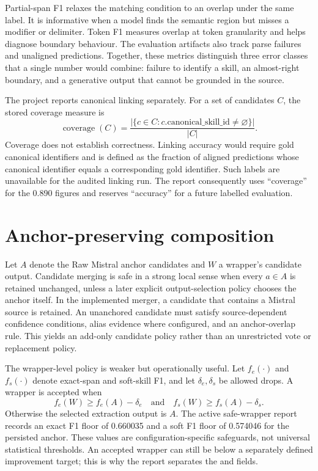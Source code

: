 Partial-span F1 relaxes the matching condition to an overlap under the same label. It is informative when a model finds the semantic region but misses a modifier or delimiter. Token F1 measures overlap at token granularity and helps diagnose boundary behaviour. The evaluation artifacts also track parse failures and unaligned predictions. Together, these metrics distinguish three error classes that a single number would combine: failure to identify a skill, an almost-right boundary, and a generative output that cannot be grounded in the source.

The project reports canonical linking separately. For a set of candidates $C$, the stored coverage measure is
\begin{equation}
 \operatorname{coverage}(C)=\frac{\left|\{c\in C: c.\text{canonical\_skill\_id}\neq\varnothing\}\right|}{|C|}.
\label{eq:coverage}
\end{equation}
Coverage does not establish correctness. Linking accuracy would require gold canonical identifiers and is defined as the fraction of aligned predictions whose canonical identifier equals a corresponding gold identifier. Such labels are unavailable for the audited linking run. The report consequently uses ``coverage'' for the 0.890 figures and reserves ``accuracy'' for a future labelled evaluation.

\section{Anchor-preserving composition}

Let $A$ denote the Raw Mistral anchor candidates and $W$ a wrapper's candidate output. Candidate merging is safe in a strong local sense when every $a\in A$ is retained unchanged, unless a later explicit output-selection policy chooses the anchor itself. In the implemented merger, a candidate that contains a Mistral source is retained. An unanchored candidate must satisfy source-dependent confidence conditions, alias evidence where configured, and an anchor-overlap rule. This yields an add-only candidate policy rather than an unrestricted vote or replacement policy.

The wrapper-level policy is weaker but operationally useful. Let $f_e(\cdot)$ and $f_s(\cdot)$ denote exact-span and soft-skill F1, and let $\delta_e,\delta_s$ be allowed drops. A wrapper is accepted when
\begin{equation}
 f_e(W)\geq f_e(A)-\delta_e \quad\text{and}\quad f_s(W)\geq f_s(A)-\delta_s.
\label{eq:gate}
\end{equation}
Otherwise the selected extraction output is $A$. The active safe-wrapper report records an exact F1 floor of 0.660035 and a soft F1 floor of 0.574046 for the persisted anchor. These values are configuration-specific safeguards, not universal statistical thresholds. An accepted wrapper can still be below a separately defined improvement target; this is why the report separates the  and  fields.

